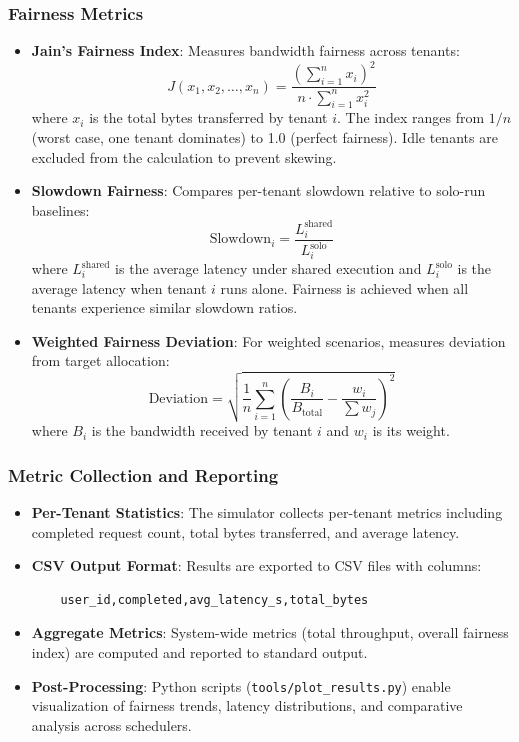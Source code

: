 \documentclass[11pt]{article}
\begin{document}
\subsubsection{Fairness Metrics}

\begin{itemize}
    \item \textbf{Jain's Fairness Index}: Measures bandwidth fairness across tenants:
    \begin{equation}
        J(x_1, x_2, \ldots, x_n) = \frac{(\sum_{i=1}^n x_i)^2}{n \cdot \sum_{i=1}^n x_i^2}
    \end{equation}
    where $x_i$ is the total bytes transferred by tenant $i$. The index ranges from $1/n$ (worst case, one tenant dominates) to 1.0 (perfect fairness). Idle tenants are excluded from the calculation to prevent skewing.
    
    \item \textbf{Slowdown Fairness}: Compares per-tenant slowdown relative to solo-run baselines:
    \begin{equation}
        \text{Slowdown}_i = \frac{L_i^{\text{shared}}}{L_i^{\text{solo}}}
    \end{equation}
    where $L_i^{\text{shared}}$ is the average latency under shared execution and $L_i^{\text{solo}}$ is the average latency when tenant $i$ runs alone. Fairness is achieved when all tenants experience similar slowdown ratios.
    
    \item \textbf{Weighted Fairness Deviation}: For weighted scenarios, measures deviation from target allocation:
    \begin{equation}
        \text{Deviation} = \sqrt{\frac{1}{n} \sum_{i=1}^n \left(\frac{B_i}{B_{\text{total}}} - \frac{w_i}{\sum w_j}\right)^2}
    \end{equation}
    where $B_i$ is the bandwidth received by tenant $i$ and $w_i$ is its weight.
\end{itemize}

\subsubsection{Metric Collection and Reporting}

\begin{itemize}
    \item \textbf{Per-Tenant Statistics}: The simulator collects per-tenant metrics including completed request count, total bytes transferred, and average latency.
    \item \textbf{CSV Output Format}: Results are exported to CSV files with columns:
    \begin{verbatim}
    user_id,completed,avg_latency_s,total_bytes
    \end{verbatim}
    \item \textbf{Aggregate Metrics}: System-wide metrics (total throughput, overall fairness index) are computed and reported to standard output.
    \item \textbf{Post-Processing}: Python scripts (\texttt{tools/plot\_results.py}) enable visualization of fairness trends, latency distributions, and comparative analysis across schedulers.
\end{itemize}
\end{document}
